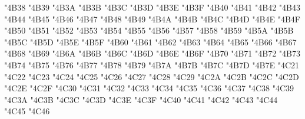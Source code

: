 {\Uchar\jis"4B38 %
\Uchar\jis"4B39 %
\Uchar\jis"4B3A %
\Uchar\jis"4B3B %
\Uchar\jis"4B3C %
\Uchar\jis"4B3D %
\Uchar\jis"4B3E %
\Uchar\jis"4B3F %
\Uchar\jis"4B40 %
\Uchar\jis"4B41 %
\Uchar\jis"4B42 %
\Uchar\jis"4B43 %
\Uchar\jis"4B44 %
\Uchar\jis"4B45 %
\Uchar\jis"4B46 %
\Uchar\jis"4B47 %
\Uchar\jis"4B48 %
\Uchar\jis"4B49 %
\Uchar\jis"4B4A %
\Uchar\jis"4B4B %
\Uchar\jis"4B4C %
\Uchar\jis"4B4D %
\Uchar\jis"4B4E %
\Uchar\jis"4B4F %
\Uchar\jis"4B50 %
\Uchar\jis"4B51 %
\Uchar\jis"4B52 %
\Uchar\jis"4B53 %
\Uchar\jis"4B54 %
\Uchar\jis"4B55 %
\Uchar\jis"4B56 %
\Uchar\jis"4B57 %
\Uchar\jis"4B58 %
\Uchar\jis"4B59 %
\Uchar\jis"4B5A %
\Uchar\jis"4B5B %
\Uchar\jis"4B5C %
\Uchar\jis"4B5D %
\Uchar\jis"4B5E %
\Uchar\jis"4B5F %
\Uchar\jis"4B60 %
\Uchar\jis"4B61 %
\Uchar\jis"4B62 %
\Uchar\jis"4B63 %
\Uchar\jis"4B64 %
\Uchar\jis"4B65 %
\Uchar\jis"4B66 %
\Uchar\jis"4B67 %
\Uchar\jis"4B68 %
\Uchar\jis"4B69 %
\Uchar\jis"4B6A %
\Uchar\jis"4B6B %
\Uchar\jis"4B6C %
\Uchar\jis"4B6D %
\Uchar\jis"4B6E %
\Uchar\jis"4B6F %
\Uchar\jis"4B70 %
\Uchar\jis"4B71 %
\Uchar\jis"4B72 %
\Uchar\jis"4B73 %
\Uchar\jis"4B74 %
\Uchar\jis"4B75 %
\Uchar\jis"4B76 %
\Uchar\jis"4B77 %
\Uchar\jis"4B78 %
\Uchar\jis"4B79 %
\Uchar\jis"4B7A %
\Uchar\jis"4B7B %
\Uchar\jis"4B7C %
\Uchar\jis"4B7D %
\Uchar\jis"4B7E %
\Uchar\jis"4C21 %
\Uchar\jis"4C22 %
\Uchar\jis"4C23 %
\Uchar\jis"4C24 %
\Uchar\jis"4C25 %
\Uchar\jis"4C26 %
\Uchar\jis"4C27 %
\Uchar\jis"4C28 %
\Uchar\jis"4C29 %
\Uchar\jis"4C2A %
\Uchar\jis"4C2B %
\Uchar\jis"4C2C %
\Uchar\jis"4C2D %
\Uchar\jis"4C2E %
\Uchar\jis"4C2F %
\Uchar\jis"4C30 %
\Uchar\jis"4C31 %
\Uchar\jis"4C32 %
\Uchar\jis"4C33 %
\Uchar\jis"4C34 %
\Uchar\jis"4C35 %
\Uchar\jis"4C36 %
\Uchar\jis"4C37 %
\Uchar\jis"4C38 %
\Uchar\jis"4C39 %
\Uchar\jis"4C3A %
\Uchar\jis"4C3B %
\Uchar\jis"4C3C %
\Uchar\jis"4C3D %
\Uchar\jis"4C3E %
\Uchar\jis"4C3F %
\Uchar\jis"4C40 %
\Uchar\jis"4C41 %
\Uchar\jis"4C42 %
\Uchar\jis"4C43 %
\Uchar\jis"4C44 %
\Uchar\jis"4C45 %
\Uchar\jis"4C46 %
}
